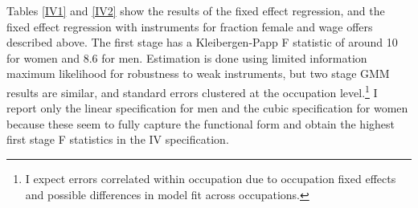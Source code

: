 \documentclass[12pt]{article}
\begin{document}



Tables \ref{IV1} and \ref{IV2} show the results of the fixed effect regression, and the fixed effect regression with instruments for fraction female and wage offers described above. The first stage has a Kleibergen-Papp F statistic of around 10 for women and 8.6 for men. Estimation is done using limited information maximum likelihood for robustness to weak instruments, but two stage GMM results are similar, and standard errors clustered at the occupation level.\footnote{I expect errors correlated within occupation due to occupation fixed effects and possible differences in model fit across occupations.} I report only the linear specification for men and the cubic specification for women because these seem to fully capture the functional form and obtain the highest first stage F statistics in the IV specification.




\end{document}
